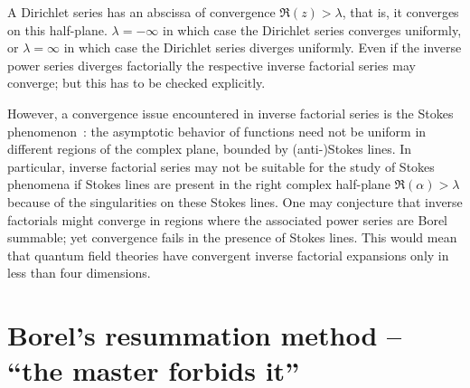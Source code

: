 A Dirichlet series has an abscissa of convergence
$\Re (z) > \lambda$, that is, it converges on this half-plane.
$\lambda =- \infty$ in which case the Dirichlet series converges uniformly, or
$\lambda = \infty$ in which case the Dirichlet series diverges uniformly.
Even if the inverse power series diverges factorially the respective inverse factorial series may converge; but this has to be
checked explicitly.

However, a convergence issue encountered in inverse factorial series is the Stokes phenomenon~\cite{Costin2016Aug,Costin_2017}:
the asymptotic behavior of functions need not be uniform in different regions of the complex plane, bounded by (anti-)Stokes lines.
In particular, inverse factorial series may not be suitable for the study of Stokes phenomena if Stokes lines
are present in the right complex half-plane $\Re ( \alpha ) > \lambda $ because of the singularities on these Stokes lines.
One may conjecture that inverse factorials might converge in regions where the associated power series are Borel summable;
yet convergence fails in the presence of Stokes lines.
This would mean that quantum field theories have convergent inverse factorial expansions only in less than four dimensions.

\section{Borel's resummation method -- ``the master forbids it''}
\label{2019-mm-ds-bresum}

